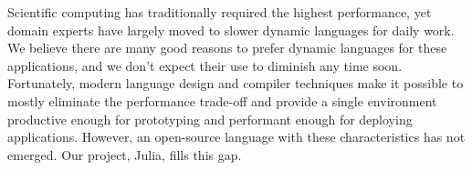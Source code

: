 \documentclass{article}
\title{\thetitle}
\author{
Jeff Bezanson \vspace{0.5em}\\
Stefan Karpinski \vspace{0.5em}\\
Viral Shah \vspace{0.5em}
}
\begin{document}
\maketitle

Scientific computing has traditionally required the highest performance,
yet domain experts have largely moved to slower dynamic languages for
daily work. We believe there are many good reasons to prefer dynamic languages
for these applications, and we don't expect their use to diminish any time
soon. Fortunately, modern language design and compiler techniques make it
possible to mostly eliminate the performance trade-off and provide a
single environment productive enough for prototyping and performant enough
for deploying applications. However, an open-source language with these
characteristics has not emerged. Our project, Julia, fills this gap.
\end{document}
